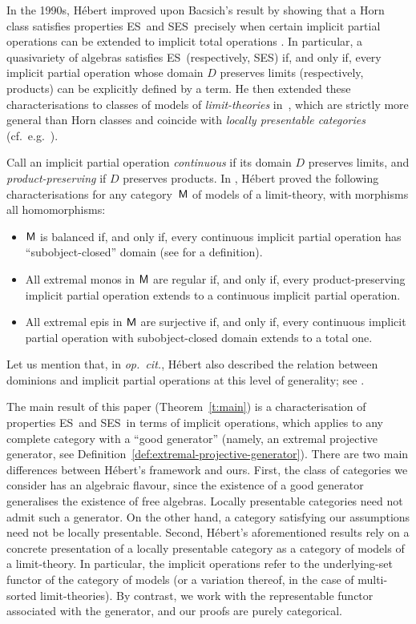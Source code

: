 \documentclass[a4paper,10pt,reqno]{amsart}
\theoremstyle{definition}
\theoremstyle{remark}
\newcommand{\M}{{\sf M}}							    %
\newcommand{\ES}{\textnormal{ES}}
\newcommand{\SES}{\textnormal{SES}}
\begin{document}
In the 1990s, H{\'e}bert improved upon Bacsich's result by showing that a Horn class satisfies properties \ES~and \SES~precisely when certain implicit partial operations can be extended to implicit total operations \cite[Théorèmes~3.12, 3.13]{Hebert1993}. 
In particular, a quasivariety of algebras satisfies \ES~(respectively, \SES) if, and only if, every implicit partial operation whose domain $D$ preserves limits (respectively, products) can be explicitly defined by a term. 
%
He then extended these characterisations to classes of models of \emph{limit-theories} in~\cite{Hebert1998}, which are strictly more general than Horn classes and coincide with \emph{locally presentable categories} (cf.\ e.g.\ \cite{GabrielUlmer1971,ar94book}).
%

Call an implicit partial operation \emph{continuous} if its domain $D$ preserves limits, and \emph{product-preserving} if $D$ preserves products.
%
In \cite[Theorem~9]{Hebert1998}, H{\'e}bert proved the following characterisations for any category~$\M$ of models of a limit-theory, with morphisms all homomorphisms:
%
\begin{itemize}
\item $\M$ is balanced if, and only if, every continuous implicit partial operation has ``subobject-closed'' domain (see \cite[Definition~4]{Hebert1998} for a definition).
\item All extremal monos in $\M$ are regular if, and only if, every product-preserving implicit partial operation extends to a continuous implicit partial operation.
\item All extremal epis in $\M$ are surjective if, and only if, every continuous implicit partial operation with subobject-closed domain extends to a total one.
\end{itemize}
%
Let us mention that, in \emph{op.~cit.}, H{\'e}bert also described the relation between dominions and implicit partial operations at this level of generality; see \cite[Theorem~8]{Hebert1998}.

\medskip
The main result of this paper (Theorem~\ref{t:main}) is a characterisation of properties \ES~and \SES~in terms of implicit operations, which applies to any complete category with a ``good generator'' (namely, an extremal projective generator, see Definition~\ref{def:extremal-projective-generator}). There are two main differences between H{\'e}bert's framework and ours. First, the class of categories we consider has an algebraic flavour, since the existence of a good generator generalises the existence of free algebras. Locally presentable categories need not admit such a generator. On the other hand, a category satisfying our assumptions need not be locally presentable. Second, H{\'e}bert's aforementioned results rely on a concrete presentation of a locally presentable category as a category of models of a limit-theory. In particular, the implicit operations refer to the underlying-set functor of the category of models (or a variation thereof, in the case of multi-sorted limit-theories). By contrast, we work with the representable functor associated with the generator, and our proofs are purely categorical.
\end{document}
